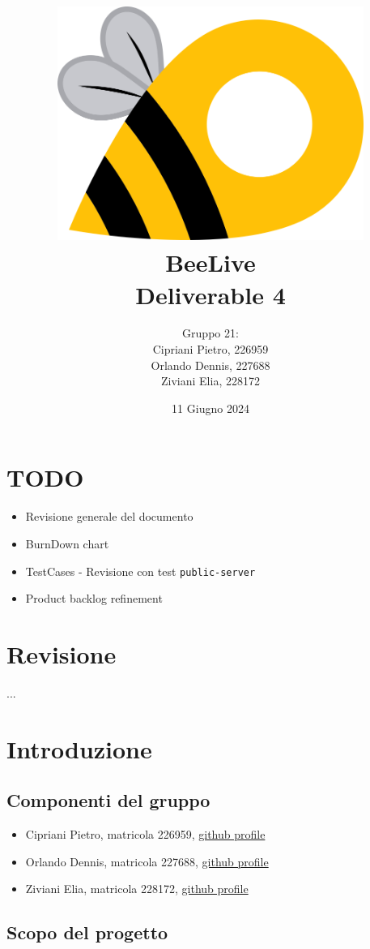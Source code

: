 \documentclass{article}
\title{\includegraphics[width=0.75\textwidth]{Images/BeeLive-Logo.png}\\\vspace{100pt}
\LARGE{\textbf{BeeLive\\Deliverable 4}}}
\author{Gruppo 21:\\
Cipriani Pietro, 226959\\
Orlando Dennis, 227688\\
Ziviani Elia, 228172}
\date{11 Giugno 2024}
\begin{document}
\maketitle
\thispagestyle{firstpage} %
\clearpage

\pagestyle{nonplain} %

\renewcommand{\contentsname}{Indice}
\tableofcontents

\clearpage

\section{TODO}
\begin{itemize}
    \item Revisione generale del documento
    \item BurnDown chart
    \item TestCases - Revisione con test \texttt{public-server}
    \item Product backlog refinement
\end{itemize}

\clearpage

\section{Revisione}
...

\clearpage

\section{Introduzione}

\subsection{Componenti del gruppo}
\begin{itemize}
    \item Cipriani Pietro, matricola 226959, \lbrack\href{https://github.com/pietrocipriani}{github profile}\rbrack
    \item Orlando Dennis, matricola 227688, \lbrack\href{https://github.com/dennisorlando}{github profile}\rbrack
    \item Ziviani Elia, matricola 228172, \lbrack\href{https://github.com/ELI20ZIVI}{github profile}\rbrack
\end{itemize}

\subsection{Scopo del progetto}
\end{document}
